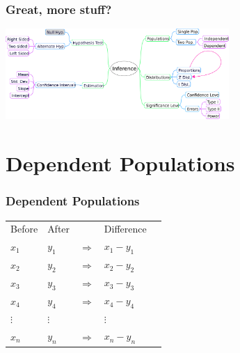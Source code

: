 \begin{frame}
  \frametitle{Great, more stuff?}
  \includegraphics[width=8.5cm]{img/inference}
\end{frame}


\section{Dependent Populations}

\begin{frame}
  \frametitle{Dependent Populations}

  \begin{tabular}{l<{\onslide<2->}l<{\onslide<3->}ll<{\onslide}l}
    Before & After & & Difference \\
    $x_1$ & $y_1$ & $\Rightarrow$ & $x_1-y_1$ \\
    $x_2$ & $y_2$ & $\Rightarrow$ & $x_2-y_2$ \\
    $x_3$ & $y_3$ & $\Rightarrow$ & $x_3-y_3$ \\
    $x_4$ & $y_4$ & $\Rightarrow$ & $x_4-y_4$ \\
    $\vdots$ & $\vdots$ & & $\vdots$ \\
    $x_n$ & $y_n$ & $\Rightarrow$ & $x_n-y_n$ \\
  \end{tabular}

\end{frame}


